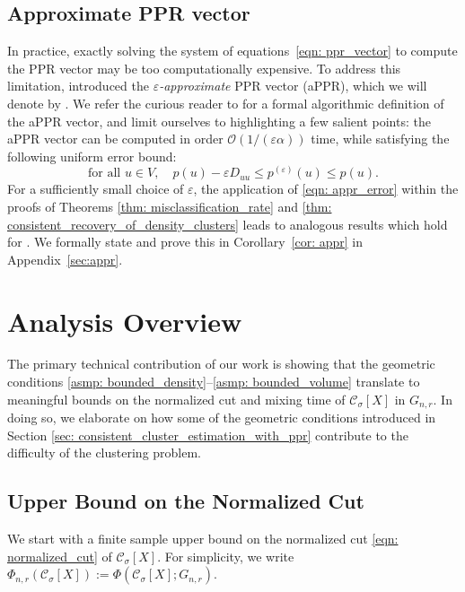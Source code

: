 \documentclass[11pt,twoside]{article}
\newcommand{\1}{\mathbf{1}}
\newcommand{\pbf}{p}        %
\newcommand{\Xbf}{X}             %
\newcommand{\Dbf}{D}
\newcommand{\Cset}{\mathcal{C}}
\newcommand{\Csig}{\Cset_{\sigma}}
\begin{document}
\subsection{Approximate PPR vector} 
In practice, exactly solving the system of equations~\eqref{eqn:
  ppr_vector} to compute the PPR vector 
  may be too computationally expensive. To address this limitation,
\citet{andersen2006} introduced the \emph{$\varepsilon$-approximate} PPR vector
(aPPR), which we will denote by \smash{$\pbf^{(\varepsilon)}$}. We refer the
curious reader to \citet{andersen2006} for a formal algorithmic definition of
the aPPR vector, and limit ourselves to highlighting a few salient points: the
aPPR vector can be computed in order $\mathcal{O}(1/(\varepsilon\alpha))$ time,
while satisfying the following uniform error bound: 
\begin{equation}
\label{eqn: appr_error}
\textrm{for all $u \in V$}, \quad \pbf(u) - \varepsilon \Dbf_{uu}\leq
\pbf^{(\varepsilon)}(u) \leq \pbf(u).  
\end{equation}
For a sufficiently small choice of $\varepsilon$, the 
application of \eqref{eqn: appr_error} within the proofs of Theorems \ref{thm:
  misclassification_rate} and \ref{thm: consistent_recovery_of_density_clusters}
leads to analogous results which hold for \smash{$\pbf^{(\varepsilon)}$}. We
formally state and prove this in Corollary~\ref{cor: appr} in 
Appendix~\ref{sec:appr}.

\section{Analysis Overview}
\label{sec: analysis}

The primary technical contribution of our work is showing that the geometric
conditions \ref{asmp: bounded_density}--\ref{asmp: bounded_volume} translate to 
meaningful bounds on the normalized cut and mixing time of $\Csig[\Xbf]$ in
$G_{n,r}$. In doing so, we elaborate on how some of the geometric conditions
introduced in Section \ref{sec: consistent_cluster_estimation_with_ppr}
contribute to the difficulty of the clustering problem. 

\subsection{Upper Bound on the Normalized Cut} 
We start with a finite sample upper bound on the
normalized cut \eqref{eqn: normalized_cut} of $\Cset_\sigma[\Xbf]$. For
simplicity, we write $\Phi_{n,r}(\Csig[\Xbf]) := \Phi(\Csig[\Xbf]; G_{n,r})$. 
\end{document}
